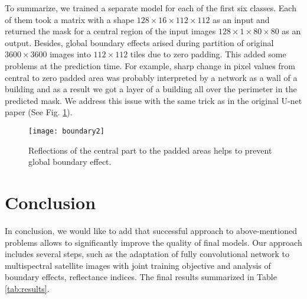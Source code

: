 \documentclass[10pt,twocolumn,letterpaper]{article}
\begin{document}
To summarize, we trained a separate model for each of the first six classes. Each of them took a matrix with a shape $128 \times 16 \times 112 \times 112$ as an input and returned the mask for a central region of the input images $128 \times 1 \times 80 \times 80$ as an output. Besides, global boundary effects arised during partition of original $3600 \times 3600$ images into $112 \times 112$ tiles due to zero padding. This added some problems at the prediction time. For example, sharp change in pixel values from central to zero padded area was probably interpreted by a network as a wall of a building and as a result we got a layer of a building all over the perimeter in the predicted mask. We address this issue with the same trick as in the original U-net paper \cite{unet} (See Fig. \ref{fig:boundary2}).

\begin{figure}[!h]
	\captionsetup{justification=centering}
	\centering
	\texttt{[image: boundary2]}
	\caption{Reflections of the central part to the padded areas helps to prevent global boundary effect.}
	\label{fig:boundary2}
\end{figure}


\section{Conclusion}

In conclusion, we would like to add that successful approach %
to above-mentioned problems allows to significantly improve the quality of final models. Our approach includes several steps, such as the adaptation of fully convolutional network to multispectral satellite images with joint training objective and analysis of boundary effects, reflectance indices. The final results summarized in Table \ref{tab:results}.
\end{document}
